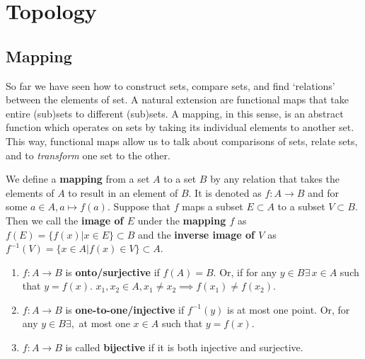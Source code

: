 \chapter{Topology}

\section{Mapping}
So far we have seen how to construct sets, compare sets, and find `relations' between the elements of set. A natural extension are functional maps that take entire (sub)sets to different (sub)sets. A mapping, in this sense, is an abstract function which operates on sets by taking its individual elements to another set. This way, functional maps allow us to talk about comparisons of sets, relate sets, and to \textit{transform} one set to the other.

\begin{definition}
We define a \textbf{mapping} from a set $A$ to a set $B$ by any relation that takes the elements of $A$ to result in an element of $B$. It is denoted as $f:A\rightarrow B$ and for some $a\in A,a \mapsto f(a)$.
Suppose that $f$ maps a subset $E\subset A$ to a subset $V\subset B$.
Then we call the \textbf{image of $E$} under the \textbf{mapping $f$} as $f(E)=\{f(x)|x\in E\}\subset B$ and the \textbf{inverse image of $V$} as $f^{-1}(V)=\{x\in A|f(x)\in V\}\subset A$.
\end{definition}

\begin{enumerate}[label=D\arabic*.]
\item $f:A\rightarrow B$ is \textbf{onto/surjective} if $f(A)=B$. Or, if for any $y\in B \exists\,x\in A$ such that $y=f(x)$. $x_1,x_2\in A, x_1\neq x_2 \implies f(x_1) \neq f(x_2)$.
\item $f:A\rightarrow B$ is \textbf{one-to-one/injective} if $f^{-1}(y)$ is at most one point. Or, for any $y\in B \exists,$ at most one $x\in A$ such that $y=f(x)$. 
\item $f:A\rightarrow B$ is called \textbf{bijective} if it is both injective and surjective.
\end{enumerate}

